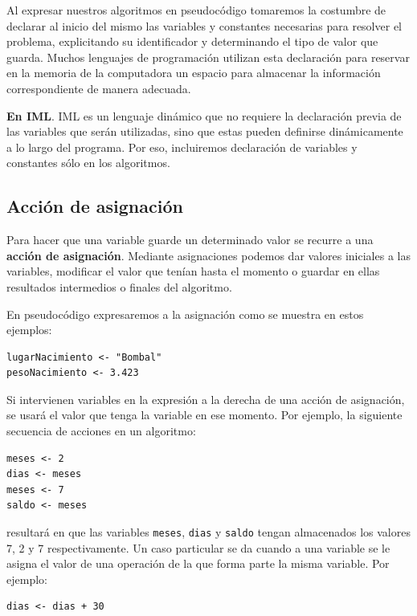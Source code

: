 \documentclass[]{book}
\begin{document}
Al expresar nuestros algoritmos en pseudocódigo tomaremos la costumbre de declarar al inicio del mismo las variables y constantes necesarias para resolver el problema, explicitando su identificador y determinando el tipo de valor que guarda. Muchos lenguajes de programación utilizan esta declaración para reservar en la memoria de la computadora un espacio para almacenar la información correspondiente de manera adecuada.

\textbf{En IML}. IML es un lenguaje dinámico que no requiere la declaración previa de las variables que serán utilizadas, sino que estas pueden definirse dinámicamente a lo largo del programa. Por eso, incluiremos declaración de variables y constantes sólo en los algoritmos.

\hypertarget{accion-de-asignacion}{%
\subsection{Acción de asignación}\label{accion-de-asignacion}}

Para hacer que una variable guarde un determinado valor se recurre a una \textbf{acción de asignación}. Mediante asignaciones podemos dar valores iniciales a las variables, modificar el valor que tenían hasta el momento o guardar en ellas resultados intermedios o finales del algoritmo.

En pseudocódigo expresaremos a la asignación como se muestra en estos ejemplos:

\begin{verbatim}
lugarNacimiento <- "Bombal"
pesoNacimiento <- 3.423
\end{verbatim}

Si intervienen variables en la expresión a la derecha de una acción de asignación, se usará el valor que tenga la variable en ese momento. Por ejemplo, la siguiente secuencia de acciones en un algoritmo:

\begin{verbatim}
meses <- 2
dias <- meses
meses <- 7
saldo <- meses
\end{verbatim}

resultará en que las variables \texttt{meses}, \texttt{dias} y \texttt{saldo} tengan almacenados los valores 7, 2 y 7 respectivamente. Un caso particular se da cuando a una variable se le asigna el valor de una operación de la que forma parte la misma variable. Por ejemplo:

\begin{verbatim}
dias <- dias + 30
\end{verbatim}
\end{document}

